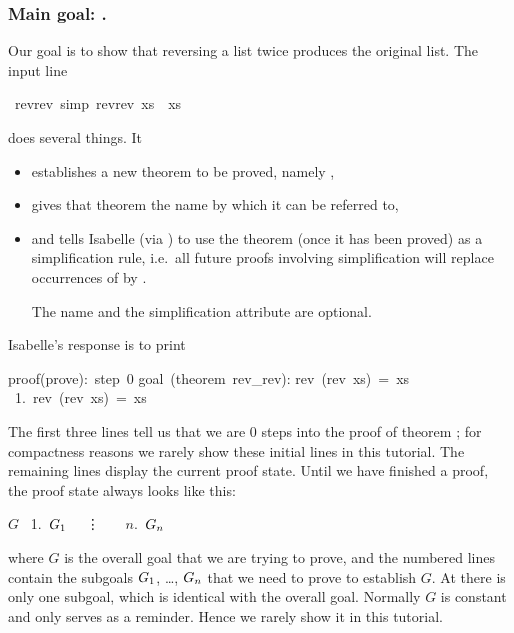\begin{isabellebody}
\begin{isamarkuptext}
\subsubsection*{Main goal: .}

Our goal is to show that reversing a list twice produces the original
list. The input line%
\end{isamarkuptext}%
\ rev{\isacharunderscore}rev\ {\isacharbrackleft}simp{\isacharbrackright}{\isacharcolon}\ {\isachardoublequote}rev{\isacharparenleft}rev\ xs{\isacharparenright}\ {\isacharequal}\ xs{\isachardoublequote}%
\begin{isamarkuptxt}%
\noindent
does several things.  It
\begin{itemize}
\item
establishes a new theorem to be proved, namely ,
\item
gives that theorem the name  by which it can be
referred to,
\item
and tells Isabelle (via ) to use the theorem (once it has been
proved) as a simplification rule, i.e.\ all future proofs involving
simplification will replace occurrences of  by
.

The name and the simplification attribute are optional.
\end{itemize}
Isabelle's response is to print
\begin{isabelle}
proof(prove):~step~0\isanewline
\isanewline
goal~(theorem~rev\_rev):\isanewline
rev~(rev~xs)~=~xs\isanewline
~1.~rev~(rev~xs)~=~xs
\end{isabelle}
The first three lines tell us that we are 0 steps into the proof of
theorem ; for compactness reasons we rarely show these
initial lines in this tutorial. The remaining lines display the current
proof state.
Until we have finished a proof, the proof state always looks like this:
\begin{isabelle}
$G$\isanewline
~1.~$G\sb{1}$\isanewline
~~\vdots~~\isanewline
~$n$.~$G\sb{n}$
\end{isabelle}
where $G$
is the overall goal that we are trying to prove, and the numbered lines
contain the subgoals $G\sb{1}$, \dots, $G\sb{n}$ that we need to prove to
establish $G$. At  there is only one subgoal, which is
identical with the overall goal.  Normally $G$ is constant and only serves as
a reminder. Hence we rarely show it in this tutorial.


\end{isamarkuptxt}
\end{isabellebody}
